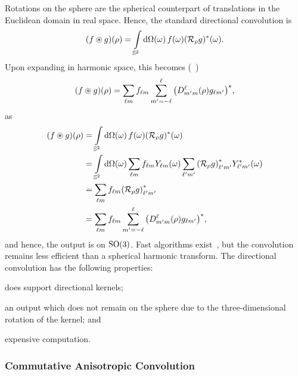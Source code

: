 Rotations on the sphere are the spherical counterpart of translations in the Euclidean domain in real space.
Hence, the standard directional convolution is
%
\begin{equation}\label{eq:chapter2_directional_convolution}
	(f \circledast g)(\rho)
	= \integrateSphere{\omega} \pixel{f} \pixel{\conj{(\rotation{\rho}g)}}.
\end{equation}
%
Upon expanding in harmonic space, this becomes (\eg{}~\cite{McEwen2007,Wandelt2001})
%
\begin{equation}
	(f \circledast g) (\rho)
	= \harmonicSum \harmonic{f} \sum\limits_{m'=-\ell}^{\ell} \conj{\big(\wigner{\ell}{m'}{m}(\rho) g_{\ell m'}\big)},
\end{equation}
%
as
%
\begin{align}
	(f \circledast g)(\rho)
	 & = \integrateSphere{\omega} \pixel{f} \pixel{\conj{(\rotation{\rho}g)}} \nonumber{}                                                                                           \\
	 & = \integrateSphere{\omega} \harmonicSum \harmonic{f} \pixel{\harmonic{Y}} \harmonicSum['] \conj{\harmonic[']{(\rotation{\rho}g)}} \pixel{\conj{\harmonic[']{Y}}} \nonumber{} \\
	 & = \harmonicSum \harmonic{f} \conj{\harmonic[']{(\rotation{\rho}g)}} \nonumber{}                                                                                              \\
	 & = \harmonicSum \harmonic{f} \sum\limits_{m'=-\ell}^{\ell} \conj{\big(\wigner{\ell}{m'}{m}(\rho) g_{\ell m'}\big)},
\end{align}
%
and hence, the output is on \(\rotationGroup{}\).
Fast algorithms exist~\cite{McEwen2007,Wandelt2001,Wiaux2007,McEwen2013}, but the convolution remains less efficient than a spherical harmonic transform.
The directional convolution has the following properties:
%
\begin{inparaenum}[(i)]
	\item does support directional kernels;
	\item an output which does not remain on the sphere due to the three-dimensional rotation of the kernel; and
	\item expensive computation.
\end{inparaenum}

\subsubsection{Commutative Anisotropic Convolution}

